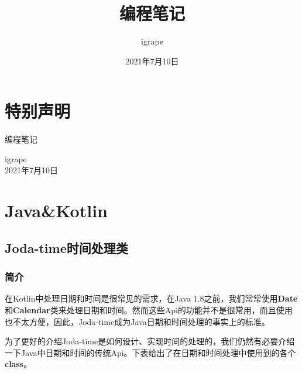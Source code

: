 \documentclass[cn,10pt,math=newtx,citestyle=gb7714-2015,bibstyle=gb7714-2015]{elegantbook}
\title{编程笔记}
\author{igrape}
\institute{TropicalTeamYard}
\date{2021年7月10日}
\begin{document}
    \maketitle

    \frontmatter

    \chapter*{特别声明}


    编程笔记

    \begin{flushright}
    igrape \\
    2021年7月10日
    \end{flushright}
    
    \tableofcontents

    \mainmatter

    \chapter{Java\&Kotlin}

    \section{Joda-time时间处理类}

    \begin{flushright}
    \end{flushright}

    \subsection{简介}

    在Kotlin中处理日期和时间是很常见的需求，在Java 1.8之前，我们常常使用\textbf{Date}和\textbf{Calendar}类来处理日期和时间。然而这些Api的功能并不是很常用，而且使用也不太方便，因此，Joda-time成为Java日期和时间处理的事实上的标准。

    为了更好的介绍Joda-time是如何设计、实现时间的处理的，我们仍然有必要介绍一下Java中日期和时间的传统Api。下表给出了在日期和时间处理中使用到的各个\textbf{class}。
\end{document}
